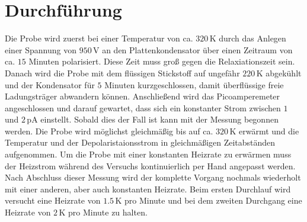 \section{Durchführung}
Die Probe wird zuerst bei einer Temperatur von ca. $320\,$K durch das Anlegen einer Spannung von $950\,$V an den Plattenkondensator über einen Zeitraum von ca. $15$ Minuten polarisiert.
Diese Zeit muss groß gegen die Relaxiationszeit sein.
Danach wird die Probe mit dem flüssigen Stickstoff auf ungefähr $220\,$K abgekühlt und der Kondensator für $5$ Minuten kurzgeschlossen, damit überflüssige freie Ladungsträger abwandern können.
Anschließend wird das Picoamperemeter angeschlossen und darauf gewartet, dass sich ein konstanter Strom zwischen $1$ und $2\,$pA einstellt.
Sobald dies der Fall ist kann mit der Messung begonnen werden.
Die Probe wird möglichst gleichmäßig bis auf ca. $320\,$K erwärmt und die Temperatur und der Depolaristaionsstrom in gleichmäßigen Zeitabständen aufgenommen.
Um die Probe mit einer konstanten Heizrate zu erwärmen muss der Heizstrom während des Versuchs kontinuierlich per Hand angepasst werden.
Nach Abschluss dieser Messung wird der komplette Vorgang nochmals wiederholt mit einer anderen, aber auch konstanten Heizrate.
Beim ersten Durchlauf wird versucht eine Heizrate von $1.5\,$K pro Minute und bei dem zweiten Durchgang eine Heizrate von $2\,$K pro Minute zu halten.